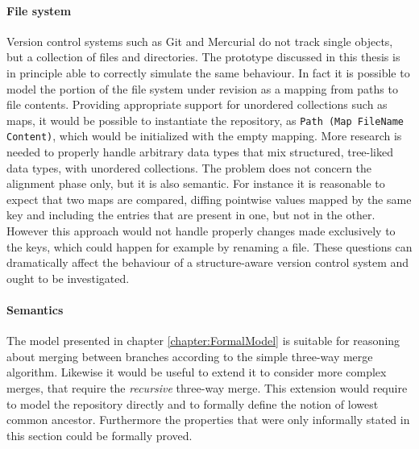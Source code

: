 \documentclass[../Thesis.tex]{subfiles}
\begin{document}
	\paragraph{File system}
	Version control systems such as Git \cite{GIT} and Mercurial 
	\cite{HG} do not track single objects, but a collection of files and 
	directories. The prototype discussed in this thesis is in principle able
	to correctly simulate the same behaviour. In fact it is possible to
	model the portion of the file system under revision as a mapping
	from paths to file contents. Providing appropriate support 
	for unordered collections such as maps, it would be 
	possible to instantiate the repository, 
	as \texttt{Path (Map FileName Content)}, which would be initialized
	with the empty mapping.
	More research is needed to properly handle arbitrary data types that 
	mix structured, tree-liked data types, with unordered collections.
	The problem does not concern the alignment phase only, but it is 
	also semantic.
	For instance it is reasonable to expect that two maps are compared,
	diffing pointwise values mapped by the same key and including
	the entries that are present in one, but not in the other.
	However this approach would not handle properly changes made
	exclusively to the keys, which could happen for example 
	by renaming a file.
	These questions can dramatically affect the behaviour of a 
	structure-aware version control	system and ought to be investigated.

	\paragraph{Semantics}
	The model presented in chapter \ref{chapter:FormalModel} 
	is suitable for reasoning about merging between branches according to
	the simple three-way merge algorithm.
	Likewise it would be useful to extend it to consider
	more complex merges, that require the \emph{recursive} three-way merge.
	This extension would require to model the repository directly and
	to formally define the notion of lowest common ancestor.
	Furthermore the properties that were only informally 
	stated in this section could be formally proved.
	
	
 	
\end{document}
